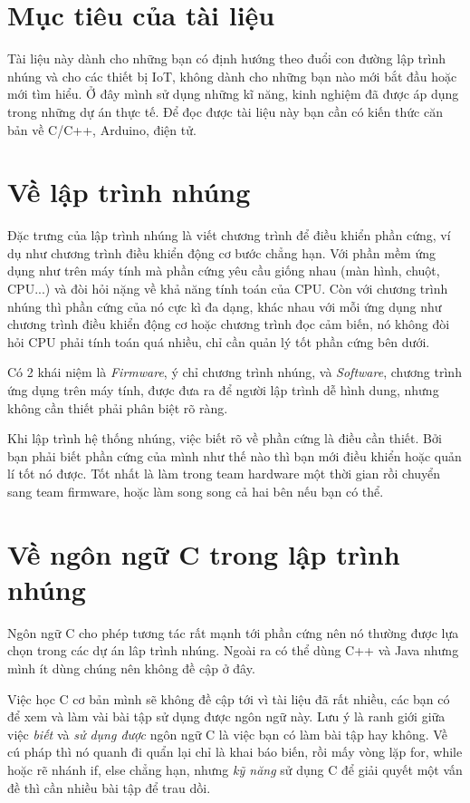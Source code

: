 \section{Mục tiêu của tài liệu}

Tài liệu này dành cho những bạn có định hướng theo đuổi con đường lập trình nhúng và cho các thiết bị IoT, không dành cho những bạn nào mới bắt đầu hoặc mới tìm hiểu. Ở đây mình sử dụng những kĩ năng, kinh nghiệm đã được áp dụng trong những dự án thực tế. Để đọc được tài liệu này bạn cần có kiến thức căn bản về C/C++, Arduino, điện tử.

\newpage

\section{Về lập trình nhúng}
    
Đặc trưng của lập trình nhúng là viết chương trình để điều khiển phần cứng, ví dụ như chương trình điều khiển động cơ bước chẳng hạn. Với phần mềm ứng dụng như trên máy tính mà phần cứng yêu cầu giống nhau (màn hình, chuột, CPU...) và đòi hỏi nặng về khả năng tính toán của CPU. Còn với chương trình nhúng thì phần cứng của nó cực kì đa dạng, khác nhau với mỗi ứng dụng như chương trình điều khiển động cơ hoặc chương trình đọc cảm biến, nó không đòi hỏi CPU phải tính toán quá nhiều, chỉ cần quản lý tốt phần cứng bên dưới. 
    
Có 2 khái niệm là \textit{Firmware}, ý chỉ chương trình nhúng, và \textit{Software}, chương trình ứng dụng trên máy tính, được đưa ra để người lập trình dễ hình dung, nhưng không cần thiết phải phân biệt rõ ràng.
    
Khi lập trình hệ thống nhúng, việc biết rõ về phần cứng là điều cần thiết. Bởi bạn phải biết phần cứng của mình như thế nào thì bạn mới điều khiển hoặc quản lí tốt nó được. Tốt nhất là làm trong team hardware một thời gian rồi chuyển sang team firmware, hoặc làm song song cả hai bên nếu bạn có thể.

\section{Về ngôn ngữ C trong lập trình nhúng}
    
Ngôn ngữ C cho phép tương tác rất mạnh tới phần cứng nên nó thường được lựa chọn trong các dự án lâp trình nhúng. Ngoài ra có thể dùng C++ và Java nhưng mình ít dùng chúng nên không đề cập ở đây.
    
Việc học C cơ bản mình sẽ không đề cập tới vì tài liệu đã rất nhiều, các bạn có để xem và làm vài bài tập sử dụng được ngôn ngữ này. Lưu ý là ranh giới giữa việc \textit{biết} và \textit{sử dụng được} ngôn ngữ C là việc bạn có làm bài tập hay không. Về cú pháp thì nó quanh đi quẩn lại chỉ là khai báo biến, rồi mấy vòng lặp for, while hoặc rẽ nhánh if, else chẳng hạn, nhưng \textit{kỹ năng} sử dụng C để giải quyết một vấn đề thì cần nhiều bài tập để trau dồi.
    
